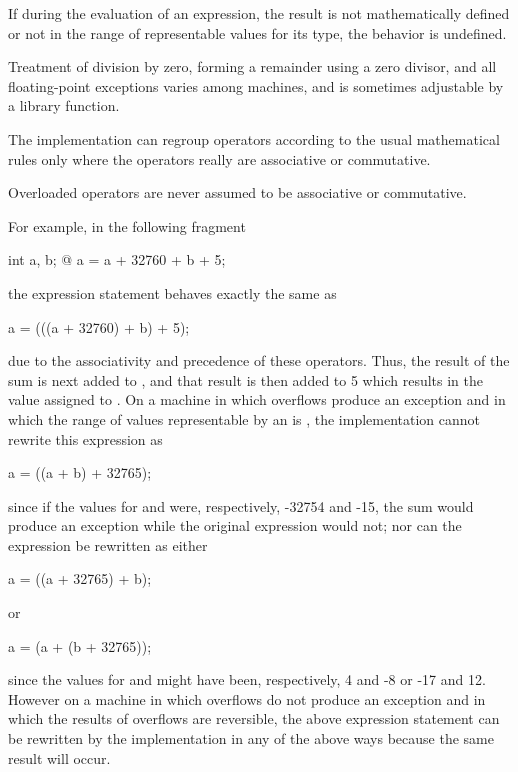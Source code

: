 \pnum
{}%
%
%
%
%
If during the evaluation of an expression, the result is not
mathematically defined or not in the range of representable values for
its type, the behavior is undefined.
\begin{note}
%
Treatment of division by zero, forming a remainder using a zero divisor,
and all floating-point exceptions varies among machines, and is sometimes
adjustable by a library function.
\end{note}

\pnum
{}%
%
\begin{note}
The implementation can regroup operators according to
the usual mathematical rules only
where the operators really are associative or commutative.
\begin{footnote}
Overloaded
operators are never assumed to be associative or commutative.
\end{footnote}
For example, in the following fragment
\begin{codeblock}
int a, b;
@\commentellip@
a = a + 32760 + b + 5;
\end{codeblock}
the expression statement behaves exactly the same as
\begin{codeblock}
a = (((a + 32760) + b) + 5);
\end{codeblock}
due to the associativity and precedence of these operators. Thus, the
result of the sum  is next added to , and
that result is then added to 5 which results in the value assigned to
. On a machine in which overflows produce an exception and in
which the range of values representable by an  is
, the implementation cannot rewrite this
expression as
\begin{codeblock}
a = ((a + b) + 32765);
\end{codeblock}
since if the values for  and  were, respectively,
-32754 and -15, the sum  would produce an exception while
the original expression would not; nor can the expression be rewritten
as either
\begin{codeblock}
a = ((a + 32765) + b);
\end{codeblock}
or
\begin{codeblock}
a = (a + (b + 32765));
\end{codeblock}
since the values for  and  might have been,
respectively, 4 and -8 or -17 and 12. However on a machine in which
overflows do not produce an exception and in which the results of
overflows are reversible, the above expression statement can be
rewritten by the implementation in any of the above ways because the
same result will occur.
\end{note}

